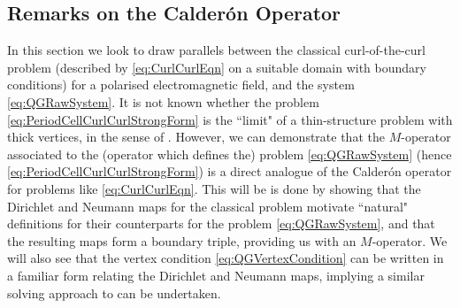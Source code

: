 
\subsection{Remarks on the Calder\'on Operator} \label{ssec:CalderonOp}
In this section we look to draw parallels between the classical curl-of-the-curl problem (described by \eqref{eq:CurlCurlEqn} on a suitable domain with boundary conditions) for a polarised electromagnetic field, and the system \eqref{eq:QGRawSystem}.
It is not known whether the problem \eqref{eq:PeriodCellCurlCurlStrongForm} is the ``limit" of a thin-structure problem with thick vertices, in the sense of .
However, we can demonstrate that the $M$-operator associated to the (operator which defines the) problem \eqref{eq:QGRawSystem} (hence \eqref{eq:PeriodCellCurlCurlStrongForm}) is a direct analogue of the Calder\'on operator for problems like \eqref{eq:CurlCurlEqn}.
This will be is done by showing that the Dirichlet and Neumann maps for the classical problem motivate ``natural" definitions for their counterparts for the problem \eqref{eq:QGRawSystem}, and that the resulting maps form a boundary triple, providing us with an $M$-operator.
We will also see that the vertex condition \eqref{eq:QGVertexCondition} can be written in a familiar form  relating the Dirichlet and Neumann maps, implying a similar solving approach to  can be undertaken.


